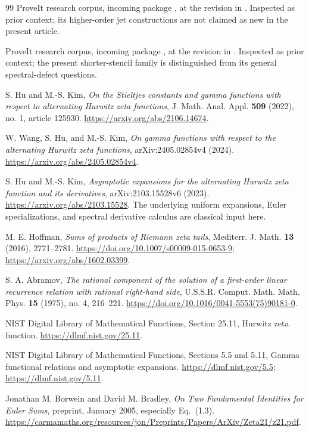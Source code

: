 \documentclass[11pt]{article}
\theoremstyle{definition}
\theoremstyle{remark}
\numberwithin{equation}{section}
\begin{document}
\begin{thebibliography}{99}
ProveIt research corpus,
incoming package
,
at the revision in \cite{ProveItPin}.
Inspected as prior context; its higher-order jet constructions are
not claimed as new in the present article.

ProveIt research corpus,
incoming package
,
at the revision in \cite{ProveItPin}.
Inspected as prior context; the present shorter-stencil family is
distinguished from its general spectral-defect questions.

S. Hu and M.-S. Kim,
\emph{On the Stieltjes constants and gamma functions with respect to
alternating Hurwitz zeta functions},
J. Math. Anal. Appl. \textbf{509} (2022), no. 1, article 125930.
\url{https://arxiv.org/abs/2106.14674}.

W. Wang, S. Hu, and M.-S. Kim,
\emph{On gamma functions with respect to the alternating Hurwitz zeta
functions}, arXiv:2405.02854v4 (2024).
\url{https://arxiv.org/abs/2405.02854v4}.

S. Hu and M.-S. Kim,
\emph{Asymptotic expansions for the alternating Hurwitz zeta function
and its derivatives}, arXiv:2103.15528v6 (2023).
\url{https://arxiv.org/abs/2103.15528}.
The underlying uniform expansions, Euler specializations, and
spectral derivative calculus are classical input here.

M. E. Hoffman,
\emph{Sums of products of Riemann zeta tails},
Mediterr. J. Math. \textbf{13} (2016), 2771--2781.
\url{https://doi.org/10.1007/s00009-015-0653-9};
\url{https://arxiv.org/abs/1602.03399}.

S. A. Abramov,
\emph{The rational component of the solution of a first-order linear
recurrence relation with rational right-hand side},
U.S.S.R. Comput. Math. Math. Phys. \textbf{15} (1975), no. 4,
216--221.
\url{https://doi.org/10.1016/0041-5553(75)90181-0}.

NIST Digital Library of Mathematical Functions, Section 25.11,
Hurwitz zeta function.
\url{https://dlmf.nist.gov/25.11}.

NIST Digital Library of Mathematical Functions, Sections 5.5 and 5.11,
Gamma functional relations and asymptotic expansions.
\url{https://dlmf.nist.gov/5.5};
\url{https://dlmf.nist.gov/5.11}.

Jonathan M. Borwein and David M. Bradley,
\emph{On Two Fundamental Identities for Euler Sums},
preprint, January 2005, especially Eq.~(1.3).
\url{https://carmamaths.org/resources/jon/Preprints/Papers/ArXiv/Zeta21/z21.pdf}.

\end{thebibliography}

\end{document}
